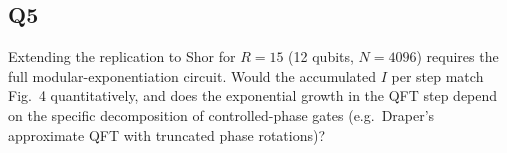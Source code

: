 \documentclass[11pt]{article}
\begin{document}
\subsection*{Q5}
Extending the replication to Shor for $R = 15$ (12 qubits, $N = 4096$)
requires the full modular-exponentiation circuit. Would the accumulated $I$
per step match Fig.~4 quantitatively, and does the exponential growth in the
QFT step depend on the specific decomposition of controlled-phase gates
(e.g.\ Draper's approximate QFT with truncated phase rotations)?
\end{document}
